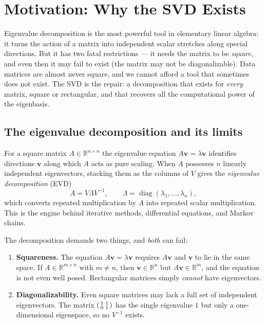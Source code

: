 \documentclass[11pt,oneside]{book}
\theoremstyle{plain}
\theoremstyle{definition}
\theoremstyle{remark}
\newcommand{\R}{\mathbb{R}}
\newcommand{\inv}{^{-1}}
\newcommand{\bv}{\mathbf{v}}
\begin{document}
\chapter{Motivation: Why the SVD Exists}

\begin{intuition_box}
Eigenvalue decomposition is the most powerful tool in elementary linear algebra: it
turns the action of a matrix into independent scalar stretches along special
directions. But it has two fatal restrictions --- it needs the matrix to be
\emph{square}, and even then it may fail to exist (the matrix may not be
diagonalizable). Data matrices are almost never square, and we cannot afford a tool
that sometimes does not exist. The SVD is the repair: a decomposition that exists for
\emph{every} matrix, square or rectangular, and that recovers all the computational
power of the eigenbasis.
\end{intuition_box}

\section{The eigenvalue decomposition and its limits}

For a square matrix $A\in\R^{n\times n}$ the eigenvalue equation
$A\bv=\lambda\bv$ identifies directions $\bv$ along which $A$ acts as pure scaling. When
$A$ possesses $n$ linearly independent eigenvectors, stacking them as the columns of
$V$ gives the \emph{eigenvalue decomposition} (EVD)
\[
A=V\Lambda V\inv,\qquad \Lambda=\operatorname{diag}(\lambda_1,\dots,\lambda_n),
\]
which converts repeated multiplication by $A$ into repeated scalar multiplication. This
is the engine behind iterative methods, differential equations, and Markov chains.

The decomposition demands two things, and \emph{both} can fail:

\begin{enumerate}[label=(\roman*),leftmargin=2.2em]
\item \textbf{Squareness.} The equation $A\bv=\lambda\bv$ requires $A\bv$ and $\bv$ to
lie in the same space. If $A\in\R^{m\times n}$ with $m\ne n$, then $\bv\in\R^n$ but
$A\bv\in\R^m$, and the equation is not even well posed. Rectangular matrices simply
\emph{cannot} have eigenvectors.
\item \textbf{Diagonalizability.} Even square matrices may lack a full set of
independent eigenvectors. The matrix $\begin{psmallmatrix}1&1\\0&1\end{psmallmatrix}$
has the single eigenvalue $1$ but only a one-dimensional eigenspace, so no
$V\inv$ exists.
\end{enumerate}
\end{document}
